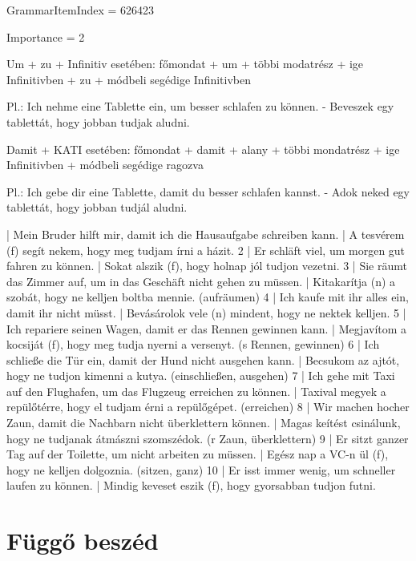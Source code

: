 \documentclass{article}
\newenvironment{desc}{\verbatim}{\endverbatim}
\newenvironment{exmp}{\verbatim}{\endverbatim}
\begin{document}
GrammarItemIndex = 626423

Importance = 2

\begin{desc}
Um + zu + Infinitiv esetében:
főmondat + um + többi modatrész + ige Infinitivben + zu + módbeli segédige Infinitivben

Pl.: Ich nehme eine Tablette ein, um besser schlafen zu können. - Beveszek egy tablettát, hogy jobban tudjak aludni.

Damit + KATI esetében:
főmondat + damit + alany + többi mondatrész + ige Infinitivben + módbeli segédige ragozva

Pl.: Ich gebe dir eine Tablette, damit du besser schlafen kannst. - Adok neked egy tablettát, hogy jobban tudjál aludni.
\end{desc}

\begin{exmp}
1 | Mein Bruder hilft mir, damit ich die Hausaufgabe schreiben kann. | A tesvérem (f) segít nekem, hogy meg tudjam írni a házit.
2 | Er schläft viel, um morgen gut fahren zu können. | Sokat alszik (f), hogy holnap jól tudjon vezetni.
3 | Sie räumt das Zimmer auf, um in das Geschäft nicht gehen zu müssen. | Kitakarítja (n) a szobát, hogy ne kelljen boltba mennie. (aufräumen)
4 | Ich kaufe mit ihr alles ein, damit ihr nicht müsst. | Bevásárolok vele (n) mindent, hogy ne nektek kelljen.
5 | Ich repariere seinen Wagen, damit er das Rennen gewinnen kann. | Megjavítom a kocsiját (f), hogy meg tudja nyerni a versenyt. (s Rennen, gewinnen)
6 | Ich schließe die Tür ein, damit der Hund nicht ausgehen kann. | Becsukom az ajtót, hogy ne tudjon kimenni a kutya. (einschließen, ausgehen)
7 | Ich gehe mit Taxi auf den Flughafen, um das Flugzeug erreichen zu können. | Taxival megyek a repülőtérre, hogy el tudjam érni a repülőgépet. (erreichen)
8 | Wir machen hocher Zaun, damit die Nachbarn nicht überklettern können. | Magas keítést csinálunk, hogy ne tudjanak átmászni szomszédok. (r Zaun, überklettern)
9 | Er sitzt ganzer Tag auf der Toilette, um nicht arbeiten zu müssen. | Egész nap a VC-n ül (f), hogy ne kelljen dolgoznia. (sitzen, ganz)
10 | Er isst immer wenig, um schneller laufen zu können. | Mindig keveset eszik (f), hogy gyorsabban tudjon futni.
\end{exmp}

\section{Függő beszéd}
\end{document}
